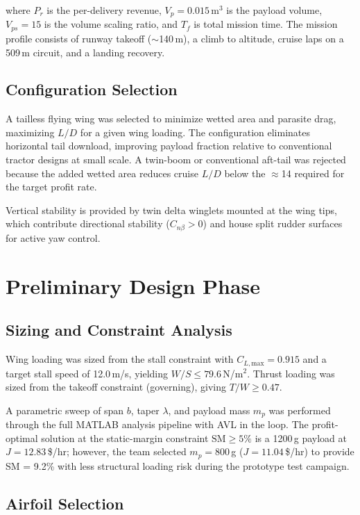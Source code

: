 \documentclass[10pt]{article}
\begin{document}
where $P_r$ is the per-delivery revenue, $V_p = 0.015$\,m$^3$ is the payload volume,
$V_{ps} = 15$ is the volume scaling ratio, and $T_f$ is total mission time.
The mission profile consists of runway takeoff ($\sim$140\,m), a climb to altitude,
cruise laps on a 509\,m circuit, and a landing recovery.

\subsection{Configuration Selection}

A tailless flying wing was selected to minimize wetted area and parasite drag,
maximizing $L/D$ for a given wing loading. The configuration eliminates
horizontal tail download, improving payload fraction relative to conventional
tractor designs at small scale. A twin-boom or conventional aft-tail was
rejected because the added wetted area reduces cruise $L/D$ below the
$\approx$14 required for the target profit rate.

Vertical stability is provided by twin delta winglets mounted at the wing tips,
which contribute directional stability ($C_{n\beta} > 0$) and house split rudder
surfaces for active yaw control.

\section{Preliminary Design Phase}

\subsection{Sizing and Constraint Analysis}

Wing loading was sized from the stall constraint with $C_{L,\text{max}} = 0.915$
and a target stall speed of 12.0\,m/s, yielding $W/S \leq 79.6$\,N/m$^2$.
Thrust loading was sized from the takeoff constraint (governing), giving
$T/W \geq 0.47$.

A parametric sweep of span $b$, taper $\lambda$, and payload mass $m_p$ was
performed through the full MATLAB analysis pipeline with AVL in the loop.
The profit-optimal solution at the static-margin constraint $\text{SM} \geq 5\%$
is a 1200\,g payload at $J = 12.83$\,\$/hr; however, the team selected
$m_p = 800$\,g ($J = 11.04$\,\$/hr) to provide SM = 9.2\% with less structural
loading risk during the prototype test campaign.

\subsection{Airfoil Selection}
\end{document}
